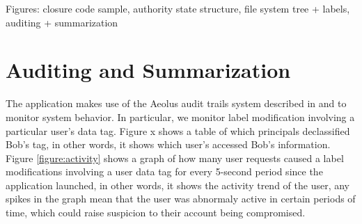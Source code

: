 Figures: closure code sample, authority state structure, file system tree + labels, auditing + summarization

\section{Auditing and Summarization}
\label{mint:auditing}
The application makes use of the Aeolus audit trails system described in \cite{popic} and \cite{blanks} to monitor system behavior. In particular, we monitor label modification involving a particular user's data tag. Figure x shows a table of which principals declassified Bob's tag, in other words, it shows which user's accessed Bob's information. Figure \ref{figure:activity} shows a graph of how many user requests caused a label modifications involving a user data tag for every 5-second period since the application launched, in other words, it shows the activity trend of the user, any spikes in the graph mean that the user was abnormaly active in certain periods of time, which could raise suspicion to their account being compromised.


